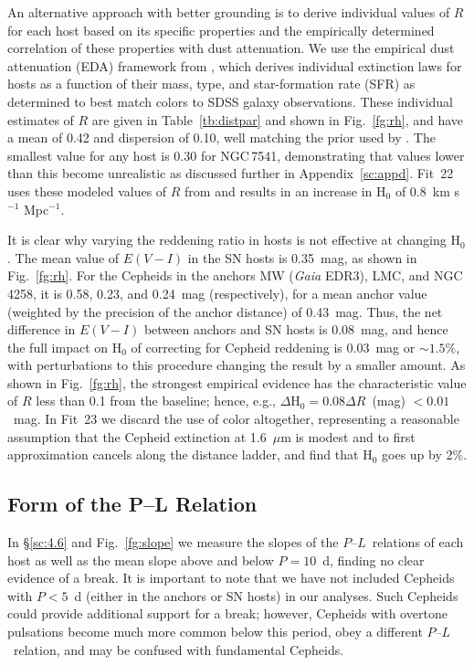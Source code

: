 \documentclass[12pt]{aastex631}
\newcommand{\kms}{km s$^{-1}$ Mpc$^{-1}$}
\newcommand{\PLs}{$P$--$L$\ }
\begin{document}
An alternative approach with better grounding is to derive individual values of $R$ for each host based on its specific properties and the empirically determined correlation of these properties with dust attenuation.  We use the empirical dust attenuation (EDA) framework from \citet{Hahn:2021}, which derives individual extinction laws for hosts as a function of their mass, type, and star-formation rate (SFR) as determined to best match colors to SDSS galaxy observations.  These individual estimates of $R$ are given in Table~\ref{tb:distpar} and shown in Fig.~\ref{fg:rh}, and have a mean of 0.42 and dispersion of 0.10, well matching the prior used by \citet{Follin:2017}.  The smallest value for any host is 0.30 for NGC$\,$7541, demonstrating that values lower than this become unrealistic as discussed further in Appendix~\ref{sc:appd}.  Fit~22 uses these modeled values of $R$ from \citet{Hahn:2021} and results in an increase in H$_0$ of 0.8~\kms.
  
It is clear why varying the reddening ratio in hosts is not effective at changing H$_0$.  The mean value of $E(V\!-\!I)$ in the SN hosts is 0.35~mag, as shown in Fig.~\ref{fg:rh}.  For the Cepheids in the anchors MW ({\it Gaia} EDR3), LMC, and NGC$\,$4258, it is 0.58, 0.23, and 0.24~mag (respectively), for a mean anchor value (weighted by the precision of the anchor distance) of 0.43~mag.  Thus, the net difference in $E(V\!-\!I)$ between anchors and SN hosts is 0.08~mag, and hence the full impact on H$_0$ of correcting for Cepheid reddening is 0.03~mag or $\sim 1.5\%$, with perturbations to this procedure changing the result by a smaller amount. As shown in Fig.~\ref{fg:rh}, the strongest empirical evidence has the characteristic value of $R$ less than 0.1 from the baseline; hence, e.g., $\Delta$H$_0=0.08\Delta R$~(mag) $< 0.01$~mag.  
In Fit~23 we discard the use of color altogether, representing a reasonable assumption that the Cepheid extinction at 1.6~$\mu$m is modest and to first approximation cancels along the distance ladder, and find that H$_0$ goes up by 2\%.

\subsection{Form of the P--L Relation\label{sc:6.4}}

In \S\ref{sc:4.6} and Fig.~\ref{fg:slope} we measure the slopes of the \PLs relations of each host as well as the mean slope above and below $P\!=\!10$~d, finding no clear evidence of a break. It is important to note that we have not included Cepheids with $P\!<\!5$~d (either in the anchors or SN hosts) in our analyses.  Such Cepheids could provide additional support for a break; however, Cepheids with overtone pulsations become much more common below this period, obey a different \PLs relation, and may be confused with fundamental Cepheids.  
\end{document}
